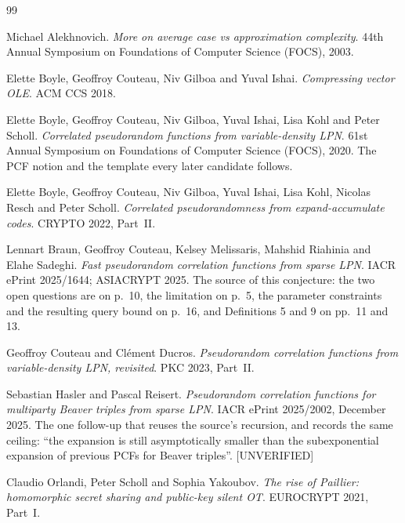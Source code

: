 \documentclass{aicr-conjecture}
\begin{document}
\begin{aicrbibliography}{99}

Michael Alekhnovich.
\emph{More on average case vs approximation complexity}.
44th Annual Symposium on Foundations of Computer Science (FOCS), 2003.

Elette Boyle, Geoffroy Couteau, Niv Gilboa and Yuval Ishai.
\emph{Compressing vector OLE}.
ACM CCS 2018.

Elette Boyle, Geoffroy Couteau, Niv Gilboa, Yuval Ishai, Lisa Kohl and
Peter Scholl.
\emph{Correlated pseudorandom functions from variable-density LPN}.
61st Annual Symposium on Foundations of Computer Science (FOCS), 2020.
The PCF notion and the template every later candidate follows.

Elette Boyle, Geoffroy Couteau, Niv Gilboa, Yuval Ishai, Lisa Kohl,
Nicolas Resch and Peter Scholl.
\emph{Correlated pseudorandomness from expand-accumulate codes}.
CRYPTO 2022, Part~II\@.

Lennart Braun, Geoffroy Couteau, Kelsey Melissaris, Mahshid Riahinia and
Elahe Sadeghi.
\emph{Fast pseudorandom correlation functions from sparse LPN}.
IACR ePrint 2025/1644; ASIACRYPT 2025.
The source of this conjecture: the two open questions are on p.\ 10, the
limitation on p.\ 5, the parameter constraints and the resulting query
bound on p.\ 16, and Definitions 5 and 9 on pp.\ 11 and 13.

Geoffroy Couteau and Cl\'ement Ducros.
\emph{Pseudorandom correlation functions from variable-density LPN,
revisited}.
PKC 2023, Part~II\@.

Sebastian Hasler and Pascal Reisert.
\emph{Pseudorandom correlation functions for multiparty Beaver triples
from sparse LPN}.
IACR ePrint 2025/2002, December 2025.
The one follow-up that reuses the source's recursion, and records the
same ceiling: ``the expansion is still asymptotically smaller than the
subexponential expansion of previous PCFs for Beaver triples''.
[UNVERIFIED]

Claudio Orlandi, Peter Scholl and Sophia Yakoubov.
\emph{The rise of Paillier: homomorphic secret sharing and public-key
silent OT}.
EUROCRYPT 2021, Part~I\@.

\end{aicrbibliography}
\end{document}
